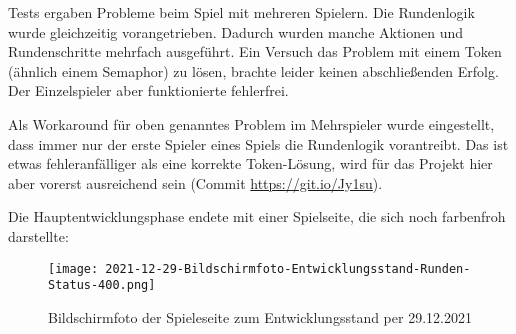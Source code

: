 Tests ergaben Probleme beim Spiel mit mehreren Spielern. Die Rundenlogik wurde gleichzeitig vorangetrieben. Dadurch wurden manche Aktionen und Rundenschritte mehrfach ausgeführt. Ein Versuch das Problem mit einem Token (ähnlich einem Semaphor) zu lösen, brachte leider keinen abschließenden Erfolg. Der Einzelspieler aber funktionierte fehlerfrei. 

Als Workaround für oben genanntes Problem im Mehrspieler wurde eingestellt, dass immer nur der erste Spieler eines Spiels die Rundenlogik vorantreibt. Das ist etwas fehleranfälliger als eine korrekte Token-Lösung, wird für das Projekt hier aber vorerst ausreichend sein (Commit \url{https://git.io/Jy1su}).

Die Hauptentwicklungsphase endete mit einer Spielseite, die sich noch farbenfroh darstellte: 

\begin{figure}[H]
    \centering
    \caption{Bildschirmfoto der Spieleseite zum Entwicklungsstand per 29.12.2021}
    \label{fig:2021-12-29-Bildschirmfoto-Entwicklungsstand-Runden-Status-400.png}
    \texttt{[image: 2021-12-29-Bildschirmfoto-Entwicklungsstand-Runden-Status-400.png]}
\end{figure}
    
